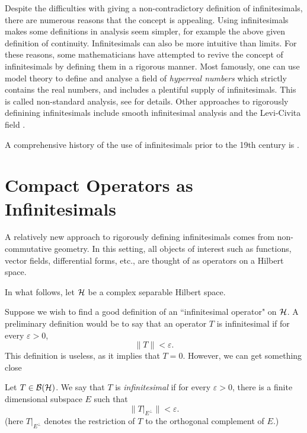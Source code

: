 Despite the difficulties with giving a non-contradictory definition
of infinitesimals, there are numerous reasons that the concept is appealing. 
Using infinitesimals makes some definitions in analysis seem simpler, for example
the above given definition of continuity. Infinitesimals
can also be more intuitive than limits. For these reasons, some mathematicians
have attempted to revive the concept of infinitesimals
by defining them in a rigorous manner. Most famously, one can 
use model theory to define and analyse a field of \emph{hyperreal numbers}
which strictly contains the real numbers, and includes a plentiful supply of infinitesimals.
This is called non-standard analysis, see \cite{robinson} for details.
Other approaches to rigorously definining infinitesimals include smooth infinitesimal
analysis \cite{sia} and the Levi-Civita field \cite{lcf}.

A comprehensive history of the use of infinitesimals prior to the 19th
century is \cite{infinitesimalBook}.

\section{Compact Operators as Infinitesimals}
A relatively new approach to rigorously defining infinitesimals
comes from non-commutative geometry. In this setting, all objects
of interest such as functions, vector fields, differential forms, etc., are
thought of as operators on a Hilbert space. 

In what follows, let $\mathcal{H}$ be a complex separable Hilbert space. 

Suppose we wish to find a good definition
of an ``infinitesimal operator" on $\mathcal{H}$. A preliminary definition
would be to say that an operator $T$ is infinitesimal if for every $\varepsilon > 0$, 
\begin{equation}
    \|T\| < \varepsilon.
\end{equation}  
This definition is useless, as it implies that $T = 0$. However, we can get something close
\begin{definition}
\label{infinitesimal}
    Let $T \in \mathcal{B}(\mathcal{H})$. We say that $T$ is \emph{infinitesimal}
    if for every $\varepsilon > 0$, there is a finite dimensional
    subspace $E$ such that
    \begin{equation}
        \|T|_{E^\perp}\| < \varepsilon.
    \end{equation}
    (here $T|_{E^\perp}$ denotes the restriction of $T$ to the orthogonal complement of $E$.)
\end{definition}

